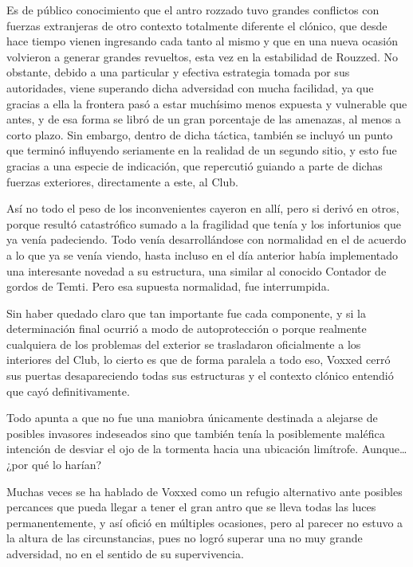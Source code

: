 \documentclass[
  spanish,
]{book}
\begin{document}
Es de público conocimiento que el antro rozzado tuvo grandes conflictos con fuerzas extranjeras de otro contexto totalmente diferente el clónico, que desde hace tiempo vienen ingresando cada tanto al mismo y que en una nueva ocasión volvieron a generar grandes revueltos, esta vez en la estabilidad de Rouzzed. No obstante, debido a una particular y efectiva estrategia tomada por sus autoridades, viene superando dicha adversidad con mucha facilidad, ya que gracias a ella la frontera pasó a estar muchísimo menos expuesta y vulnerable que antes, y de esa forma se libró de un gran porcentaje de las amenazas, al menos a corto plazo. Sin embargo, dentro de dicha táctica, también se incluyó un punto que terminó influyendo seriamente en la realidad de un segundo sitio, y esto fue gracias a una especie de indicación, que repercutió guiando a parte de dichas fuerzas exteriores, directamente a este, al Club.

Así no todo el peso de los inconvenientes cayeron en allí, pero si derivó en otros, porque resultó catastrófico sumado a la fragilidad que tenía y los infortunios que ya venía padeciendo. Todo venía desarrollándose con normalidad en el de acuerdo a lo que ya se venía viendo, hasta incluso en el día anterior había implementado una interesante novedad a su estructura, una similar al conocido Contador de gordos de Temti. Pero esa supuesta normalidad, fue interrumpida.

Sin haber quedado claro que tan importante fue cada componente, y si la determinación final ocurrió a modo de autoprotección o porque realmente cualquiera de los problemas del exterior se trasladaron oficialmente a los interiores del Club, lo cierto es que de forma paralela a todo eso, Voxxed cerró sus puertas desapareciendo todas sus estructuras y el contexto clónico entendió que cayó definitivamente.

Todo apunta a que no fue una maniobra únicamente destinada a alejarse de posibles invasores indeseados sino que también tenía la posiblemente maléfica intención de desviar el ojo de la tormenta hacia una ubicación limítrofe. Aunque\ldots{} ¿por qué lo harían?

Muchas veces se ha hablado de Voxxed como un refugio alternativo ante posibles percances que pueda llegar a tener el gran antro que se lleva todas las luces permanentemente, y así ofició en múltiples ocasiones, pero al parecer no estuvo a la altura de las circunstancias, pues no logró superar una no muy grande adversidad, no en el sentido de su supervivencia.
\end{document}
